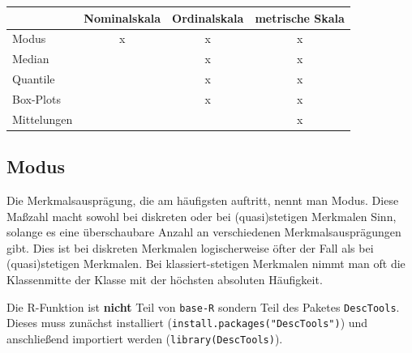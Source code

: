 \documentclass[a4paper]{article}
\newcommand\dangersign[1][2ex]{%
  \renewcommand\stacktype{L}%
  \scaleto{\stackon[1.3pt]{\color{red}$\triangle$}{\tiny !}}{#1}%
}
\begin{document}
\begin{center}
 \begin{tabular}{|l c c c|} 
 \hline
 & Nominalskala & Ordinalskala& metrische Skala\\
 \hline\hline
 Modus &x & x & x \\ 
 \hline
 Median &  & x & x \\
 \hline
 Quantile &  & x & x \\
 \hline
 Box-Plots &  & x & x \\
 \hline
Mittelungen &  &  & x \\
 \hline
\end{tabular}
\end{center}

\subsection{Modus}
Die Merkmalsausprägung, die am häufigsten auftritt, nennt man Modus. Diese Maßzahl macht sowohl bei diskreten oder bei (quasi)stetigen Merkmalen Sinn, solange es eine überschaubare Anzahl an verschiedenen Merkmalsausprägungen gibt. Dies ist bei diskreten Merkmalen logischerweise öfter der Fall als bei (quasi)stetigen Merkmalen. Bei klassiert-stetigen Merkmalen nimmt man oft die Klassenmitte der Klasse mit der höchsten absoluten Häufigkeit.\\

\noindent {}

\noindent \dangersign[3ex] Die R-Funktion ist \textbf{nicht} Teil von \texttt{base-R} sondern Teil des Paketes \texttt{DescTools}. Dieses muss zunächst installiert (\texttt{install.packages("DescTools")}) und anschließend importiert werden (\texttt{library(DescTools)}).
\end{document}
